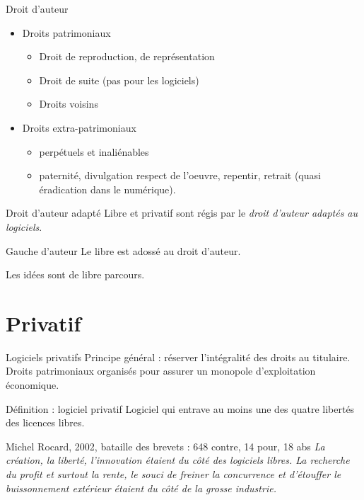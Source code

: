 \documentclass{beamer}
\begin{document}
\begin{frame}{Droit d'auteur}

  \begin{itemize}
  \item Droits patrimoniaux
    \begin{itemize}
    \item Droit de reproduction, de représentation
    \item Droit de suite (pas pour les logiciels)
    \item Droits voisins
    \end{itemize}
  \item Droits extra-patrimoniaux
    \begin{itemize}
    \item perpétuels et inaliénables
    \item paternité, divulgation  respect de l'oeuvre, repentir, retrait (quasi éradication dans le numérique).
    \end{itemize}
  \end{itemize}

 \begin{alertblock}{Droit d'auteur adapté}
    Libre et privatif sont régis par le \textit{droit d'auteur adaptés au logiciels}.
  \end{alertblock}

  \begin{alertblock}{Gauche d'auteur}
    Le libre est adossé au droit d'auteur.
  \end{alertblock}
  
  Les idées sont de libre parcours.
\end{frame}


\section{Privatif}


\begin{frame}{Logiciels privatifs}
  Principe général : réserver l'intégralité des droits au titulaire. Droits patrimoniaux organisés pour assurer un monopole d'exploitation économique.

  \begin{alertblock}{Définition : logiciel privatif}
    Logiciel qui entrave au moins une des quatre libertés des licences libres.    
  \end{alertblock}

\pause

  \begin{block}{Michel Rocard, 2002, bataille des brevets : 648 contre, 14 pour, 18 abs}
   \textit{ La création, la liberté, l'innovation étaient du côté des logiciels libres. La recherche du profit et surtout la rente, le souci de freiner la concurrence et d'étouffer le buissonnement extérieur étaient du côté de la grosse industrie.
}
  \end{block}
\end{frame}
\end{document}
